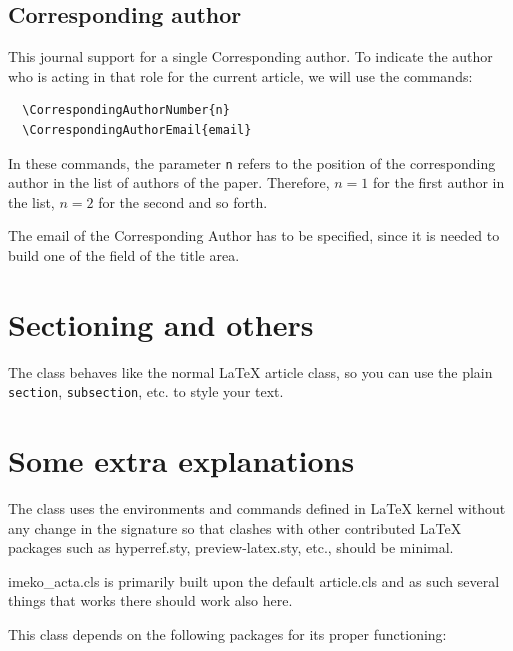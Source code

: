 \documentclass[11pt,onecolumn,notitlepage]{article}
\def\file#1{\textsf{\fontsize{9.2}{9.5}\selectfont\color{MidnightBlue}#1}\xspace}
\begin{document}
\subsection{Corresponding author}

This journal support for a single Corresponding author.
To indicate the author who is acting in that role for the current article, we will use the commands:
\begin{verbatim}
  \CorrespondingAuthorNumber{n}
  \CorrespondingAuthorEmail{email}
\end{verbatim}

In these commands, the parameter \verb|n| refers to the position of the corresponding author in the list of authors of the paper. Therefore, $n=1$ for the first author in the list, $n=2$ for the second and so forth.

The email of the Corresponding Author has to be specified, since it is needed to build one of the field of the title area.


\section{Sectioning and others}

The class behaves like the normal \LaTeX{} article class, so you can use the plain \verb|section|, \verb|subsection|, etc. 
to style your text.

\section{Some extra explanations}


The class uses the environments and commands defined in \LaTeX{} kernel
without any change in the signature so that clashes with other
contributed \LaTeX{} packages such as \file{hyperref.sty},
\file{preview-latex.sty}, etc., should be minimal.


\file{imeko\_acta.cls} is primarily built upon the default
\file{article.cls} and as such several things that works there should work also here.  

This class depends on the following packages
for its proper functioning:
\end{document}
